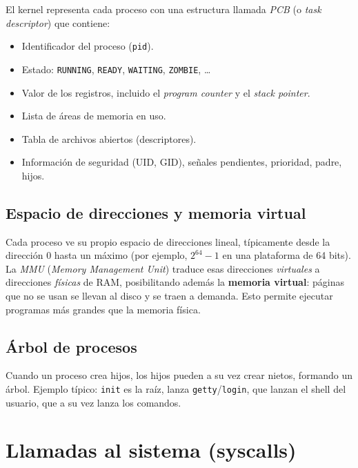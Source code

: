 \documentclass[11pt,a4paper]{article}
\begin{document}
El kernel representa cada proceso con una estructura llamada \emph{PCB}
(o \emph{task descriptor}) que contiene:

\begin{itemize}[leftmargin=*]
    \item Identificador del proceso (\texttt{pid}).
    \item Estado: \texttt{RUNNING}, \texttt{READY}, \texttt{WAITING},
        \texttt{ZOMBIE}, \ldots
    \item Valor de los registros, incluido el \emph{program counter} y
        el \emph{stack pointer}.
    \item Lista de áreas de memoria en uso.
    \item Tabla de archivos abiertos (descriptores).
    \item Información de seguridad (UID, GID), señales pendientes,
        prioridad, padre, hijos.
\end{itemize}

\subsection{Espacio de direcciones y memoria virtual}

Cada proceso ve su propio espacio de direcciones lineal, típicamente
desde la dirección 0 hasta un máximo (por ejemplo, $2^{64}-1$ en una
plataforma de 64 bits). La \emph{MMU} (\emph{Memory Management Unit})
traduce esas direcciones \emph{virtuales} a direcciones \emph{físicas}
de RAM, posibilitando además la \textbf{memoria virtual}: páginas que
no se usan se llevan al disco y se traen a demanda. Esto permite
ejecutar programas más grandes que la memoria física.

\subsection{Árbol de procesos}

Cuando un proceso crea hijos, los hijos pueden a su vez crear nietos,
formando un árbol. Ejemplo típico: \texttt{init} es la raíz, lanza
\texttt{getty}/\texttt{login}, que lanzan el shell del usuario, que a
su vez lanza los comandos.

\section{Llamadas al sistema (syscalls)}
\end{document}
